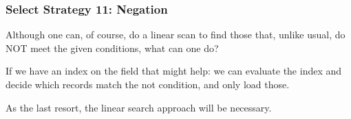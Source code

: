 \begin{frame}
\frametitle{Select Strategy 11: Negation}

Although one can, of course, do a linear scan to find those that, unlike usual, do NOT meet the given conditions, what can one do? 

If we have an index on the field that might help: we can evaluate the index and decide which records match the not condition, and only load those. 

As the last resort, the linear search approach will be necessary.

\end{frame}



